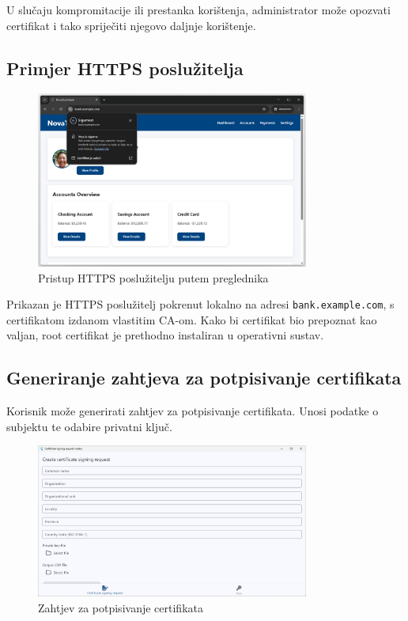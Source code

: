 \documentclass[]{foi}
\begin{document}
U slučaju kompromitacije ili prestanka korištenja, administrator može opozvati certifikat i tako spriječiti njegovo daljnje korištenje.

\subsection{Primjer HTTPS poslužitelja}

\begin{figure}[H]
    \centering
    \includegraphics[width=0.8\textwidth]{assets/bank.png}
    \caption{Pristup HTTPS poslužitelju putem preglednika}
\end{figure}

Prikazan je HTTPS poslužitelj pokrenut lokalno na adresi \texttt{bank.example.com}, s certifikatom izdanom vlastitim CA-om. Kako bi certifikat bio prepoznat kao valjan, root certifikat je prethodno instaliran u operativni sustav.

\subsection{Generiranje zahtjeva za potpisivanje certifikata}

Korisnik može generirati zahtjev za potpisivanje certifikata.
Unosi podatke o subjektu te odabire privatni ključ.

\begin{figure}[H]
    \centering
    \includegraphics[width=0.8\textwidth]{assets/csr.png}
    \caption{Zahtjev za potpisivanje certifikata}
\end{figure}
\end{document}
